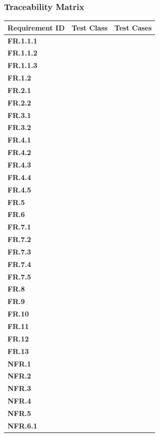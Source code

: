 \documentclass[10pt,a4paper]{article}
\newcommand{\fr}[1]{\textcolor{reqColor}{\textbf{FR.#1}}}
\newcommand{\nfr}[1]{\textcolor{reqColor}{\textbf{NFR.#1}}}
\begin{document}
\subsubsection{Traceability Matrix}

\begin{longtable}[H]{| p{2.3cm} | p{2.7cm} | p{7cm}|}
  \hline\rowcolor{titleColor} \textbf{Requirement ID} & \textbf{Test Class} & \textbf{Test Cases}\\
  \hline \fr{1.1.1} & & \\
  \hline \fr{1.1.2} & & \\
  \hline \fr{1.1.3} & & \\
  \hline \fr{1.2}   & & \\
  \hline \fr{2.1}   & & \\
  \hline \fr{2.2}   & & \\
  \hline \fr{3.1}   & & \\
  \hline \fr{3.2}   & & \\
  \hline \fr{4.1}   & & \\
  \hline \fr{4.2}   & & \\
  \hline \fr{4.3}   & & \\
  \hline \fr{4.4}   & & \\
  \hline \fr{4.5}   & & \\
  \hline \fr{5}     & & \\
  \hline \fr{6}     & & \\
  \hline \fr{7.1}   & & \\
  \hline \fr{7.2}   & & \\
  \hline \fr{7.3}   & & \\
  \hline \fr{7.4}   & & \\
  \hline \fr{7.5}   & & \\
  \hline \fr{8}     & & \\
  \hline \fr{9}     & & \\
  \hline \fr{10}    & & \\
  \hline \fr{11}    & & \\
  \hline \fr{12}    & & \\
  \hline \fr{13}    & & \\
  \hline \nfr{1}    & & \\
  \hline \nfr{2}    & & \\
  \hline \nfr{3}    & & \\
  \hline \nfr{4}    & & \\
  \hline \nfr{5}    & & \\
  \hline \nfr{6.1}  & & \\

\end{longtable}
\end{document}
